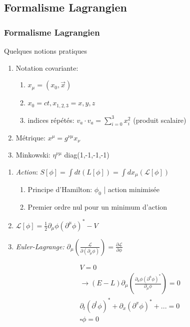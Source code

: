 \documentclass[handout]{beamer}
\begin{document}
\subsection{Formalisme Lagrangien}
\begin{frame}

\frametitle{Formalisme Lagrangien}

\begin{block}{Quelques notions pratiques}
\begin{enumerate}

\item Notation covariante:
\begin{enumerate}
\item $x_\mu = (x_0,\vec{x})$
\item $x_0 = ct, x_{1,2,3} = x,y,z$
\item indices répétés: $v_a \cdot v_a = \sum_{i=0}^{3}x_i^2$ (produit scalaire)
\end{enumerate}
\item Métrique: $x^\mu = g^{\nu\mu} x_\nu$
\item Minkowski: $\eta^{\nu\mu}$ diag(1,-1,-1,-1) 
\end{enumerate}
\end{block}
\end{frame}

\begin{frame}
\begin{enumerate}
\item \textit{Action}: $S[\phi] = \int{dt (L[\phi])}  =  \int{dx_\mu (\mathcal{L}[\phi])}$
\begin{enumerate}
\item Principe d'Hamilton: $\phi_0$ | action minimisée \\
\item Premier ordre nul pour un minimum d'action \\
\end{enumerate}
\item  $\mathcal{L}[\phi] = \frac{1}{2} \partial_\mu \phi (\partial^\mu \phi)^* -V$
\item \textit{Euler-Lagrange:} $\partial_\mu \left(\frac{\mathcal{L}}{\partial(\partial_\mu\phi)}\right) = \frac{\partial\mathcal{L}}{\partial\phi}$
\end{enumerate}
\begin{align*}
 V=0 \\
 \rightarrow (E-L)  \partial_\mu(\frac{\partial_a\phi (\partial^a\phi)^* }{\partial_\mu \phi}) = 0 \\
 \partial_t(\partial^{t} \phi )^{*} + \partial_x(\partial^{x} \phi )^{*} +... = 0 \\
 \square \phi = 0 \\
\end{align*}
\end{frame}
\end{document}
